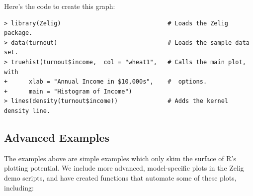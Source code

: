 Here's the code to create this graph:
\begin{verbatim}
> library(Zelig)                              # Loads the Zelig package.
> data(turnout)                               # Loads the sample data set.
> truehist(turnout$income,  col = "wheat1",   # Calls the main plot, with   
+      xlab = "Annual Income in $10,000s",    #  options.  
+      main = "Histogram of Income") 
> lines(density(turnout$income))              # Adds the kernel density line.  
\end{verbatim} %

\newpage

\subsection{Advanced Examples} 

The examples above are simple examples which only skim the surface of
R's plotting potential.  We include more advanced, model-specific
plots in the Zelig demo scripts, and have created functions that
automate some of these plots, including:  

